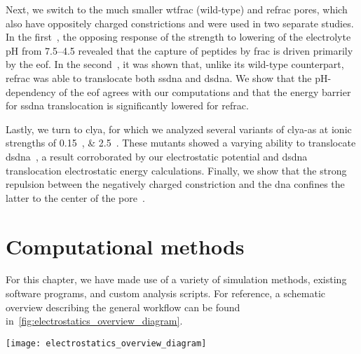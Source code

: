Next, we switch to the much smaller \gls{wtfrac} (wild-type) and \gls{refrac} pores, which also have oppositely
charged constrictions and were used in two separate studies. In the first~\cite{Huang-2017}, the opposing
response of the  strength to lowering of the electrolyte pH from \numrange{7.5}{4.5} revealed
that the capture of peptides by \gls{frac} is driven primarily by the \gls{eof}. In the
second~\cite{Wloka-2016}, it was shown that, unlike its wild-type counterpart, \gls{refrac} was able to
translocate both \gls{ssdna} and \gls{dsdna}. We show that the pH-dependency of the \gls{eof} agrees with our
computations and that the energy barrier for \gls{ssdna} translocation is significantly lowered for
\gls{refrac}.

Lastly, we turn to \gls{clya}, for which we analyzed several variants of \gls{clya-as} at ionic strengths of
\SIlist{0.15;2.5}{\Molar}. These mutants showed a varying ability to translocate
\gls{dsdna}~\cite{Franceschini-2016}, a result corroborated by our electrostatic potential and \gls{dsdna}
translocation electrostatic energy calculations. Finally, we show that the strong repulsion between the
negatively charged constriction and the \gls{dna} confines the latter to the center of the
pore~\cite{Bayoumi-2020}.


%
%
\clearpage
%
%


%
%
\section{Computational methods}
%
\label{sec:elec:methods}
%

For this chapter, we have made use of a variety of simulation methods, existing software programs, and custom
analysis scripts. For reference, a schematic overview describing the general workflow can be found
in~\cref{fig:electrostatics_overview_diagram}.

%
\begin{figure*}[b]
  \centering
  
  \texttt{[image: electrostatics\_overview\_diagram]}

\caption[Diagram of the electrostatic simulation methodology]{%
  \textbf{Diagram of the electrostatic simulation methodology.}
  Overview of the molecular modeling, electrostatic simulation, and data analysis steps performed within this
  chapter.
  }\label{fig:electrostatics_overview_diagram}
\end{figure*}
%

%
%
\clearpage
%
%


